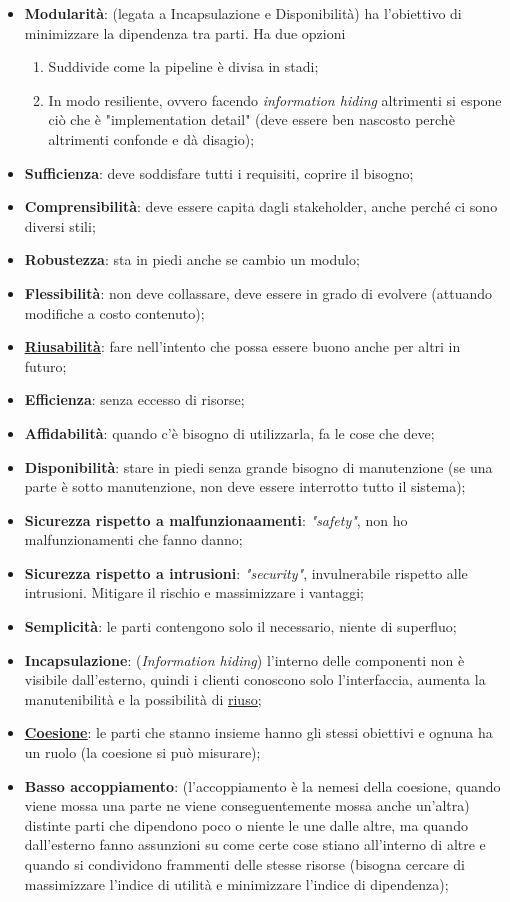 		\begin{itemize}
			\item \textbf{Modularità}: (legata a Incapsulazione e Disponibilità) ha l'obiettivo di minimizzare la dipendenza tra parti. Ha due opzioni
			\begin{enumerate}
				\item Suddivide come la pipeline è divisa in stadi;
				\item In modo resiliente, ovvero facendo \textit{information hiding} altrimenti si espone ciò che è "implementation detail" (deve essere ben nascosto perchè altrimenti confonde e dà disagio);
			\end{enumerate}
			\item \textbf{Sufficienza}: deve soddisfare tutti i requisiti, coprire il bisogno;
			\item \textbf{Comprensibilità}: deve essere capita dagli stakeholder, anche perché ci sono diversi stili;
			\item \textbf{Robustezza}: sta in piedi anche se cambio un modulo;
			\item \textbf{Flessibilità}: non deve collassare, deve essere in grado di evolvere (attuando modifiche a costo contenuto);
			\item \textbf{\underline{\hyperref[riuso]{Riusabilità}}}: fare nell'intento che possa essere buono anche per altri in futuro;
			\item \textbf{Efficienza}: senza eccesso di risorse;
			\item \textbf{Affidabilità}: quando c'è bisogno di utilizzarla, fa le cose che deve;
			\item \textbf{Disponibilità}: stare in piedi senza grande bisogno di manutenzione (se una parte è sotto manutenzione, non deve essere interrotto tutto il sistema);
			\item \textbf{Sicurezza rispetto a malfunzionaamenti}: \textit{"safety"}, non ho malfunzionamenti che fanno danno;
			\item \textbf{Sicurezza rispetto a intrusioni}: \textit{"security"}, invulnerabile rispetto alle intrusioni. Mitigare il rischio e massimizzare i vantaggi;
			\item \textbf{Semplicità}: le parti contengono solo il necessario, niente di superfluo;
			\item \textbf{Incapsulazione}: (\textit{Information hiding}) l'interno delle componenti non è visibile dall'esterno, quindi i clienti conoscono solo l'interfaccia, aumenta la manutenibilità e la possibilità di \underline{\hyperref[riuso]{riuso}};
			\item \textbf{\underline{\hyperref[coeso]{Coesione}}}: le parti che stanno insieme hanno gli stessi obiettivi e ognuna ha un ruolo (la coesione si può misurare);
			\item \textbf{Basso accoppiamento}: (l'accoppiamento è la nemesi della coesione, quando viene mossa una parte ne viene conseguentemente mossa anche un'altra) distinte parti che dipendono poco o niente le une dalle altre, ma quando dall'esterno fanno assunzioni su come certe cose stiano all'interno di altre e quando si condividono frammenti delle stesse risorse (bisogna cercare di massimizzare l'indice di utilità e minimizzare l'indice di dipendenza);
		\end{itemize}
